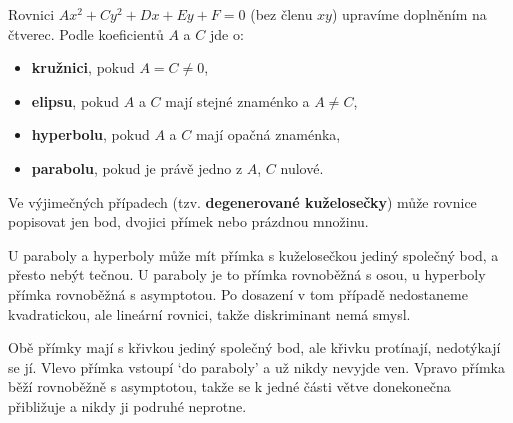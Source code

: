 \begin{definitionbox}
  Rovnici $Ax^2 + Cy^2 + Dx + Ey + F = 0$ (bez členu $xy$) upravíme doplněním na čtverec. Podle koeficientů $A$ a $C$ jde o:
  \begin{itemize}
    \item \textbf{kružnici}, pokud $A = C\neq 0$,
    \item \textbf{elipsu}, pokud $A$ a $C$ mají stejné znaménko a $A\neq C$,
    \item \textbf{hyperbolu}, pokud $A$ a $C$ mají opačná znaménka,
    \item \textbf{parabolu}, pokud je právě jedno z $A$, $C$ nulové.
  \end{itemize}
  Ve výjimečných případech (tzv. \textbf{degenerované kuželosečky}) může rovnice popisovat jen bod, dvojici přímek nebo prázdnou množinu.
\end{definitionbox}

\begin{note}\label{note:jediny-bod-netecna}
  U paraboly a hyperboly může mít přímka s kuželosečkou jediný společný bod, a přesto nebýt tečnou. U paraboly je to přímka rovnoběžná s osou, u hyperboly přímka rovnoběžná s asymptotou. Po dosazení v tom případě nedostaneme kvadratickou, ale lineární rovnici, takže diskriminant nemá smysl.
\end{note}

\begin{center}
  \hspace{1.5cm}
\end{center}
Obě přímky mají s křivkou jediný společný bod, ale křivku protínají, nedotýkají se jí. Vlevo přímka vstoupí `do paraboly' a už nikdy nevyjde ven. Vpravo přímka běží rovnoběžně s asymptotou, takže se k jedné části větve donekonečna přibližuje a nikdy ji podruhé neprotne.

